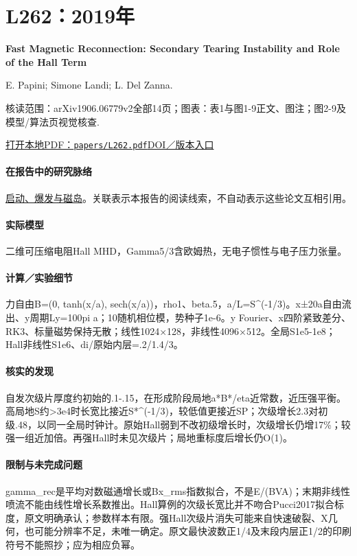 \section{L262：2019年}\label{paper:L262}

\textbf{Fast Magnetic Reconnection: Secondary Tearing Instability and Role of the Hall Term}\citep{L262}\

E. Papini;  Simone Landi;  L. Del Zanna.

\textsf{核读范围：}arXiv1906.06779v2全部14页；\textsf{图表：}表1与图1-9正文、图注；图2-9及模型/算法页视觉核查.

\href{run:papers/L262.pdf}{打开本地PDF：\texttt{papers/L262.pdf}}\quad\href{https://doi.org/10.3847/1538-4357/ab4352}{DOI／版本入口}

\paragraph{在报告中的研究脉络}\hyperref[story:onset]{启动、爆发与磁岛}。关联表示本报告的阅读线索，不自动表示这些论文互相引用。

\paragraph{实际模型}二维可压缩电阻Hall MHD，Gamma5/3含欧姆热，无电子惯性与电子压力张量。

\paragraph{计算／实验细节}力自由B=(0, tanh(x/a), sech(x/a))，rho1、beta.5，a/L=S\textasciicircum{}(-1/3)。x±20a自由流出、y周期Ly=100pi a；10随机相位模，势种子1e-6。y Fourier、x四阶紧致差分、RK3、标量磁势保持无散；线性1024×128，非线性4096×512。全局S1e5-1e8；Hall非线性S1e6、di/原始内层=.2/1.4/3。

\paragraph{核实的发现}自发次级片厚度约初始的.1-.15，在形成阶段局地a*B*/eta近常数，近压强平衡。高局地S约>3e4时长宽比接近S*\textasciicircum{}(-1/3)，较低值更接近SP；次级增长2.3对初级.48，以同一全局时钟计。原始Hall弱到不改初级增长时，次级增长仍增17\%；较强一组近加倍。再强Hall时未见次级片；局地重标度后增长仍O(1)。

\paragraph{限制与未完成问题}gamma\_rec是平均对数磁通增长或Bx\_rms指数拟合，不是E/(BVA)；末期非线性喷流不能由线性增长系数推出。Hall算例的次级长宽比并不吻合Pucci2017拟合标度，原文明确承认；参数样本有限。强Hall次级片消失可能来自快速破裂、X几何，也可能分辨率不足，未唯一确定。原文最快波数正1/4及末段内层正1/2的印刷符号不能照抄；应为相应负幂。

